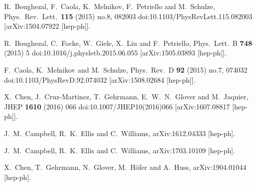   R.~Boughezal, F.~Caola, K.~Melnikov, F.~Petriello and M.~Schulze,
  Phys.\ Rev.\ Lett.\  {\bf 115} (2015) no.8,  082003
  doi:10.1103/PhysRevLett.115.082003
  [arXiv:1504.07922 [hep-ph]].


  R.~Boughezal, C.~Focke, W.~Giele, X.~Liu and F.~Petriello,
  Phys.\ Lett.\ B {\bf 748} (2015) 5
  doi:10.1016/j.physletb.2015.06.055
  [arXiv:1505.03893 [hep-ph]].

  F.~Caola, K.~Melnikov and M.~Schulze,
  Phys.\ Rev.\ D {\bf 92} (2015) no.7,  074032
  doi:10.1103/PhysRevD.92.074032
  [arXiv:1508.02684 [hep-ph]].

  X.~Chen, J.~Cruz-Martinez, T.~Gehrmann, E.~W.~N.~Glover and M.~Jaquier,
  JHEP {\bf 1610} (2016) 066
  doi:10.1007/JHEP10(2016)066
  [arXiv:1607.08817 [hep-ph]].



  J.~M.~Campbell, R.~K.~Ellis and C.~Williams,
  arXiv:1612.04333 [hep-ph].


  J.~M.~Campbell, R.~K.~Ellis and C.~Williams,
  arXiv:1703.10109 [hep-ph].

  X.~Chen, T.~Gehrmann, N.~Glover, M.~Höfer and A.~Huss,
  arXiv:1904.01044 [hep-ph].


